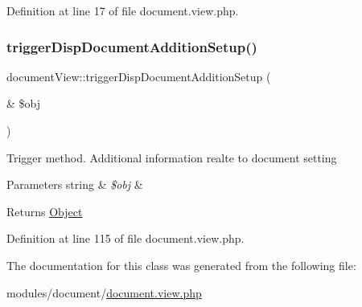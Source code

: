 Definition at line 17 of file document.\+view.\+php.

\hypertarget{classdocumentView_a0ea8992b5f032e29e528cbb9ab1b709c}{}\label{classdocumentView_a0ea8992b5f032e29e528cbb9ab1b709c} 
\subsubsection{\texorpdfstring{trigger\+Disp\+Document\+Addition\+Setup()}{triggerDispDocumentAdditionSetup()}}
{\footnotesize\ttfamily document\+View\+::trigger\+Disp\+Document\+Addition\+Setup (\begin{DoxyParamCaption}\item[{\&}]{\$obj }\end{DoxyParamCaption})}

Trigger method. Additional information realte to document setting 
\begin{DoxyParams}[1]{Parameters}
string & {\em \$obj} & \\
\hline
\end{DoxyParams}
\begin{DoxyReturn}{Returns}
\hyperlink{classObject}{Object} 
\end{DoxyReturn}


Definition at line 115 of file document.\+view.\+php.



The documentation for this class was generated from the following file\+:\begin{DoxyCompactItemize}
\item 
modules/document/\hyperlink{document_8view_8php}{document.\+view.\+php}\end{DoxyCompactItemize}
